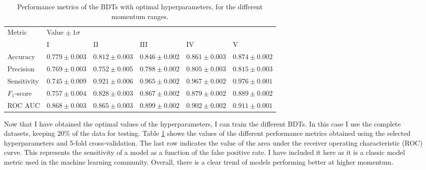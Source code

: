 \begin{table}[t]
	\caption{Performance metrics of the BDTs with optimal hyperparameters, for the different momentum ranges.}
	\begin{center}
		\begin{small}
			\begin{tabular}{l|lllll}
				\multirow{2}{*}{Metric} & \multicolumn{5}{l}{Value $\pm ~ 1\sigma$}                                                                \\[2mm] \cline{2-6}
										& \rule{0pt}{1.1\normalbaselineskip}I                 & II                & III               & IV                & V                 \\[2mm] \hline
										\rule{0pt}{1.1\normalbaselineskip}Accuracy                & $0.779 \pm 0.003$ & $0.812 \pm 0.003$ & $0.846 \pm 0.002$ & $0.861 \pm 0.003$ & $0.874 \pm 0.002$ \\[2mm]
				Precision               & $0.769 \pm 0.003$ & $0.752 \pm 0.005$ & $0.788 \pm 0.002$ & $0.805 \pm 0.003$ & $0.815 \pm 0.003$ \\[2mm]
				Sensitivity             & $0.745 \pm 0.009$ & $0.921 \pm 0.006$ & $0.965 \pm 0.002$ & $0.967 \pm 0.002$ & $0.976 \pm 0.001$ \\[2mm]
				$F_{1}$-score           & $0.757 \pm 0.004$ & $0.828 \pm 0.003$ & $0.867 \pm 0.002$ & $0.879 \pm 0.002$ & $0.889 \pm 0.002$ \\[2mm]
				ROC AUC                 & $0.868 \pm 0.003$ & $0.865 \pm 0.003$ & $0.899 \pm 0.002$ & $0.902 \pm 0.002$ & $0.911 \pm 0.001$
			\end{tabular}
		\end{small}
	\end{center}
	\label{tab:bdt_metrics}
\end{table}

Now that I have obtained the optimal values of the hyperparameters, I can train the different BDTs. In this case I use the complete datasets, keeping $20\%$ of the data for testing. Table \ref{tab:bdt_metrics} shows the values of the different performance metrics obtained using the selected hyperparameters and 5-fold cross-validation. The last row indicates the value of the area under the receiver operating characteristic (ROC) curve. This represents the sensitivity of a model as a function of the false positive rate. I have included it here as it is a classic model metric used in the machine learning community. Overall, there is a clear trend of models performing better at higher momentum.


